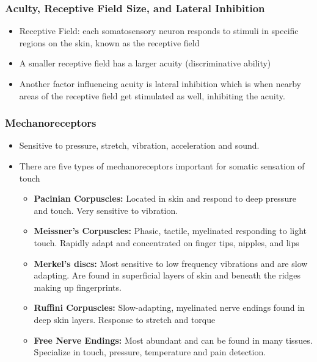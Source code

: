 \documentclass[11pt]{article}
\begin{document}
\subsubsection{Aculty, Receptive Field Size, and Lateral Inhibition}
\begin{itemize}
\item Receptive Field: each somatosensory neuron responds to stimuli in specific regions on the skin, known as the receptive field
\item A smaller receptive field has a larger acuity (discriminative ability)
\item Another factor influencing acuity is lateral inhibition which is when nearby areas of the receptive field get stimulated as well, inhibiting the acuity.
\end{itemize}




\subsubsection{Mechanoreceptors}
\begin{itemize}
\item Sensitive to pressure, stretch, vibration, acceleration and sound. 
\item There are five types of mechanoreceptors important for somatic sensation of touch
\begin{itemize}
\item \textbf{Pacinian Corpuscles:} Located in skin and respond to deep pressure and touch. Very sensitive to vibration. 
\item \textbf{Meissner’s Corpuscles:} Phasic, tactile, myelinated responding to light touch. Rapidly adapt and concentrated on finger tips, nipples, and lips
\item \textbf{Merkel’s discs:} Most sensitive to low frequency vibrations and are slow adapting. Are found in superficial layers of skin and beneath the ridges making up fingerprints. 
\item \textbf{Ruffini Corpuscles:} Slow-adapting, myelinated nerve endings found in deep skin layers. Response to stretch and torque 
\item \textbf{Free Nerve Endings:} Most abundant and can be found in many tissues. Specialize in touch, pressure, temperature and pain detection. 
\end{itemize}

\end{itemize}
\end{document}
